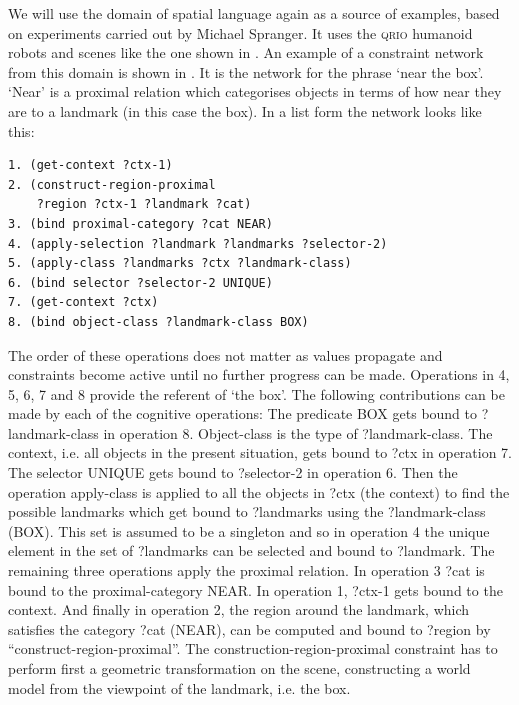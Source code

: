 We will use the domain of spatial language again as a source of examples, based on experiments carried out by 
Michael Spranger. It uses the \textsc{qrio} humanoid robots 
and scenes like the one shown in . An example of a constraint network from this domain 
is shown in . It is the network for the phrase `near the box'. `Near' is a proximal 
relation which categorises objects in terms of how near they are to a landmark (in this case the box). In a list form the 
network looks like this: 
\begin{small}
\begin{verbatim}
1. (get-context ?ctx-1) 
2. (construct-region-proximal 
    ?region ?ctx-1 ?landmark ?cat) 
3. (bind proximal-category ?cat NEAR) 
4. (apply-selection ?landmark ?landmarks ?selector-2)
5. (apply-class ?landmarks ?ctx ?landmark-class) 
6. (bind selector ?selector-2 UNIQUE) 
7. (get-context ?ctx) 
8. (bind object-class ?landmark-class BOX)
\end{verbatim}
\end{small}
The order of these operations does not matter as values propagate and constraints become active until no further progress
can be made. Operations in 4, 5, 6, 7 and 8 provide the referent of `the box'. The following contributions 
can be made by each of the cognitive operations: The predicate BOX gets bound to ?landmark-class in operation 8. Object-class is 
the type of ?landmark-class. The context, i.e. all objects in the present situation, gets bound to ?ctx in operation 7. 
The selector UNIQUE gets bound to ?selector-2 in operation 6. 
Then the operation apply-class is applied to all the objects in ?ctx (the context) to find the possible landmarks which 
get bound to ?landmarks using the ?landmark-class (BOX). This set is assumed to be a singleton and so 
in operation 4 the unique element in the set of ?landmarks can be selected 
and bound to ?landmark. 
\enlargethispage{1\baselineskip}
The remaining three operations apply the proximal relation. In operation 3 ?cat is bound to the proximal-category NEAR. 
In operation 1, ?ctx-1 gets bound to 
the context. And finally in operation 2, the region around the landmark, which satisfies the category ?cat (NEAR), can 
be computed and bound to ?region by ``construct-region-proximal''. The construction-region-proximal constraint has to perform first 
a geometric transformation on the scene, constructing a world model from the viewpoint of the landmark, i.e. the box. 

